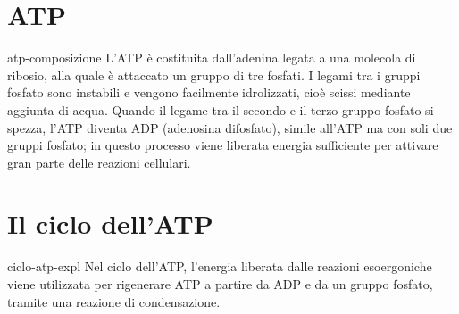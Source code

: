 \documentclass[preview]{standalone}
\begin{document}
\genpage

\section{ATP}


\begin{snippet}{atp-composizione}
    L'ATP è costituita dall'adenina legata a una molecola di ribosio, alla quale è
    attaccato un gruppo di tre fosfati. I legami tra i gruppi fosfato sono instabili e vengono
    facilmente idrolizzati, cioè scissi mediante aggiunta di acqua. Quando il legame tra il
    secondo e il terzo gruppo fosfato si spezza, l'ATP diventa ADP (adenosina difosfato), simile
    all'ATP ma con soli due gruppi fosfato; in questo processo viene liberata energia sufficiente
    per attivare gran parte delle reazioni cellulari.
\end{snippet}


\section{Il ciclo dell'ATP}

\begin{snippet}{ciclo-atp-expl}
    Nel ciclo dell'ATP, l'energia liberata dalle reazioni esoergoniche viene utilizzata per
    rigenerare ATP a partire da ADP e da un gruppo fosfato, tramite una reazione di
    condensazione.
\end{snippet}

\end{document}
